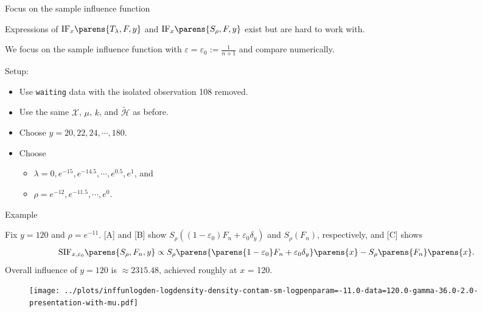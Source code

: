 \documentclass[aspectratio=169,xcolor=dvipsnames]{beamer}
\newcommand{\calH}{\mathcal{H}}
\begin{document}
\begin{frame}{Focus on the sample influence function}
	
	Expressions of $\mathrm{IF}_{x} \parens{T_{\lambda}, F, y}$ and $\mathrm{IF}_x \parens{S_{\rho}, F, y}$ exist but are hard to work with. 
	
	\vspace{5pt}
	
	We focus on the sample influence function with $\varepsilon = \varepsilon_0 := \frac{1}{n+1}$ and compare numerically. 
	
	\vspace{15pt}
	
	{\color{defaultcolor} Setup:}
	
	\begin{itemize}
		\item Use \texttt{waiting} data with the isolated observation 108 removed. 
		\item Use the same $\mathcal{X}$, $\mu$, $k$, and $\widetilde{\calH}$ as before. 
		\item Choose $y = 20, 22, 24, \cdots, 180$. 
		\item Choose 
		\begin{itemize}
			\item $\lambda = 0, e^{-15}, e^{-14.5}, \cdots, e^{0.5}, e^1$, and 
			\item $\rho = e^{-12}, e^{-11.5}, \cdots, e^0$. 
		\end{itemize}
	\end{itemize}
	
\end{frame}


\begin{frame}{Example}

	Fix $y = 120$ and $\rho = e^{-11}$. [A] and [B] show $S_{\rho} ((1 - \varepsilon_0) F_n + \varepsilon_0 \delta_y)$ and $S_{\rho} (F_n)$, respectively, and [C] shows 
	\begin{align*}
		\mathrm{SIF}_{x, \varepsilon_0} \parens{S_{\rho}, F_n, y} \propto S_{\rho} \parens{ \parens{1 - \varepsilon_0} F_n + \varepsilon_0 \delta_y} \parens{x} - S_{\rho} \parens{F_n} \parens{x}. 
	\end{align*}
	Overall influence of $y = 120$ is $\approx 2315.48$, achieved roughly at $x$ = 120. 
	
	\begin{figure}
		\centering
		\texttt{[image: ../plots/inffunlogden-logdensity-density-contam-sm-logpenparam=-11.0-data=120.0-gamma-36.0-2.0-presentation-with-mu.pdf]}
	\end{figure}
		
\end{frame}
\end{document}
